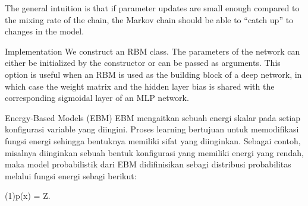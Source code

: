 \documentclass[12pt]{article}
\begin{document}
The general intuition is that if parameter updates are small enough compared to the mixing rate of the chain, the Markov chain should be able to “catch up” to changes in the model.

Implementation
We construct an RBM class. The parameters of the network can either be initialized by the constructor or can be passed as arguments. This option is useful when an RBM is used as the building block of a deep network, in which case the weight matrix and the hidden layer bias is shared with the corresponding sigmoidal layer of an MLP network.


Energy-Based Models (EBM)
EBM mengaitkan sebuah energi skalar pada setiap konfigurasi variable yang diingini. Proses learning bertujuan untuk memodifikasi fungsi energi sehingga bentuknya memiliki  sifat yang diinginkan. Sebagai contoh, misalnya diinginkan sebuah bentuk konfigurasi yang memiliki energi yang rendah, maka model probabilistik dari EBM didifinisikan sebagi distribusi probabilitas melalui fungsi energi sebagi berikut:

(1)p(x) =  {Z}.
\end{document}

